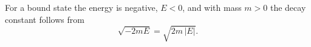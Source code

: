 \documentclass{article}
\begin{document}
For a bound state the energy is negative, $E<0$, and with mass $m>0$ the decay constant follows from
\begin{equation}
\sqrt{-2mE} = \sqrt{2m\,|E|} .
\label{eq:kappa}
\end{equation}
\end{document}
